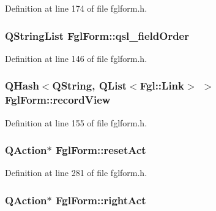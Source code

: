 Definition at line 174 of file fglform.h.

\hypertarget{classFglForm_ab53b016e506ad4ed7fdb2ac2210d43b1}{
\subsubsection[{qsl\_\-fieldOrder}]{\setlength{\rightskip}{0pt plus 5cm}QStringList {\bf FglForm::qsl\_\-fieldOrder}}}
\label{classFglForm_ab53b016e506ad4ed7fdb2ac2210d43b1}


Definition at line 146 of file fglform.h.

\hypertarget{classFglForm_a2e8895a4cd6f58cc36f31c8a51c06a54}{
\subsubsection[{recordView}]{\setlength{\rightskip}{0pt plus 5cm}QHash$<$QString, QList$<${\bf Fgl::Link}$>$ $>$ {\bf FglForm::recordView}}}
\label{classFglForm_a2e8895a4cd6f58cc36f31c8a51c06a54}


Definition at line 155 of file fglform.h.

\hypertarget{classFglForm_aa9bb2c29fa0161164dd5250a7602a1be}{
\subsubsection[{resetAct}]{\setlength{\rightskip}{0pt plus 5cm}QAction$\ast$ {\bf FglForm::resetAct}}}
\label{classFglForm_aa9bb2c29fa0161164dd5250a7602a1be}


Definition at line 281 of file fglform.h.

\hypertarget{classFglForm_ac85748725f2a9ba437e62be1293eae02}{
\subsubsection[{rightAct}]{\setlength{\rightskip}{0pt plus 5cm}QAction$\ast$ {\bf FglForm::rightAct}}}
\label{classFglForm_ac85748725f2a9ba437e62be1293eae02}


